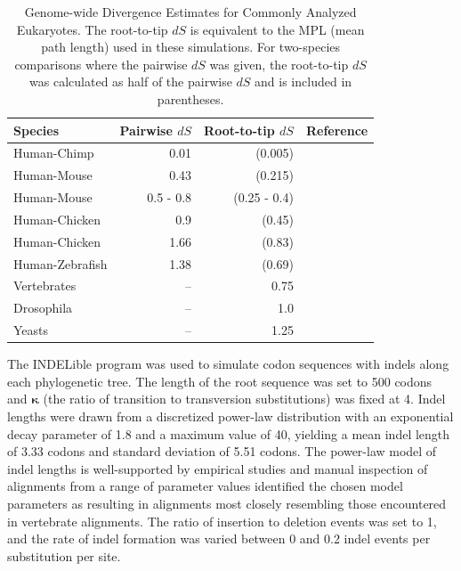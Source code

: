 \begin{table}
\centering
\begin{tabular}{lrrl}
\toprule
 Species & Pairwise $dS$ & Root-to-tip $dS$ & Reference \\
\midrule
   Human-Chimp & 0.01 & (0.005) & \citealp{Nei2010Neutral}
\\ Human-Mouse & 0.43 & (0.215) & \citealp{Nei2010Neutral}
\\ Human-Mouse & 0.5 - 0.8 & (0.25 - 0.4) & \citealp{Ogurtsov2004Indel}
\\ Human-Chicken & 0.9 & (0.45) & \citealp{Nei2010Neutral}
\\ Human-Chicken & 1.66 & (0.83) & \citealp{Hillier2004}
\\ Human-Zebrafish & 1.38 & (0.69) & \citealp{Nei2010Neutral}
\\ Vertebrates & -- & 0.75 & \citealp{Siepel2005}
\\ Drosophila & -- & 1.0 & \citealp{Siepel2005}
\\ Yeasts & -- & 1.25 & \citealp{Siepel2005} \\
\bottomrule
\end{tabular}
\caption{Genome-wide Divergence Estimates for Commonly Analyzed
  Eukaryotes. The root-to-tip $dS$ is equivalent to the MPL (mean path
  length) used in these simulations. For two-species comparisons where
  the pairwise $dS$ was given, the root-to-tip $dS$ was calculated as
  half of the pairwise $dS$ and is included in parentheses.}
\label{table_2}
\end{table}

The INDELible program \citep{Fletcher2009INDELible} was used to
simulate codon sequences with indels along each phylogenetic tree. The
length of the root sequence was set to 500 codons and $\bm{\kappa}$ (the
ratio of transition to transversion substitutions) was fixed at 4.
Indel lengths were drawn from a discretized
power-law distribution with an exponential decay parameter of 1.8 and
a maximum value of 40, yielding a mean indel length of 3.33 codons and
standard deviation of 5.51 codons. The power-law model of indel
lengths is well-supported by empirical studies
\citep{Benner1993Empirical,Cartwright2009Problems} and manual
inspection of alignments from a range of parameter values identified
the chosen model parameters as resulting in alignments most closely
resembling those encountered in vertebrate alignments. The ratio of
insertion to deletion events was set to 1, and the rate of indel
formation was varied between 0 and 0.2 indel events per substitution
per site.


